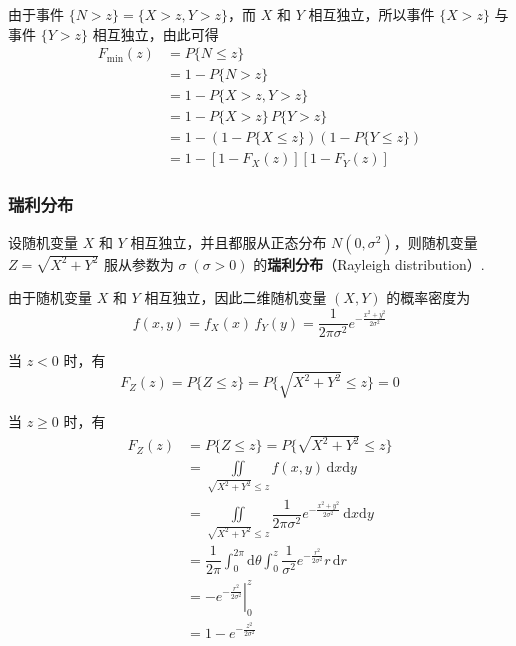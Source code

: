 由于事件 $\{N>z\} = \{X>z, Y>z\}$，而 $X$ 和 $Y$ 相互独立，所以事件 $\{X>z\}$ 与事件 $\{Y>z\}$ 相互独立，由此可得
$$
\begin{aligned}
    F_{\text{min}}(z) &= P\{N \leqslant z\} \\
    &= 1 - P\{N>z\} \\
    &= 1 - P\{X>z, Y>z\} \\
    &= 1 - P\{X>z\} \, P\{Y>z\} \\
    &= 1 - (1 - P\{X \leqslant z\})(1 - P\{Y \leqslant z\}) \\
    &= 1 - [1 - F_{X}(z)][1 - F_{Y}(z)]
\end{aligned}
$$

\subsubsection{瑞利分布}

设随机变量 $X$ 和 $Y$ 相互独立，并且都服从正态分布 $N(0, \sigma^2)$，则随机变量 $Z = \sqrt{X^2 + Y^2}$ 服从参数为 $\sigma \; (\sigma > 0)$ 的\textbf{瑞利分布}（Rayleigh distribution）.

由于随机变量 $X$ 和 $Y$ 相互独立，因此二维随机变量 $(X,Y)$ 的概率密度为
$$
f(x,y) = f_{X}(x) \, f_{Y}(y) = \dfrac{1}{2 \pi \sigma^2} e^{-\frac{x^2 + y^2}{2 \sigma^2}}
$$

当 $z<0$ 时，有
$$
F_{Z}(z) = P\{Z \leqslant z\} = P\{\sqrt{X^2 + Y^2} \leqslant z\} = 0
$$

当 $z \geqslant 0$ 时，有
$$
\begin{aligned}
    F_{Z}(z) &= P\{Z \leqslant z\} = P\{\sqrt{X^2 + Y^2} \leqslant z\} \\
    &= \underset{\sqrt{X^2 + Y^2} \leqslant z}{\iint} f(x,y) \, \text{d}x \text{d}y \\
    &= \underset{\sqrt{X^2 + Y^2} \leqslant z}{\iint} \dfrac{1}{2 \pi \sigma^2} e^{-\frac{x^2 + y^2}{2 \sigma^2}} \, \text{d}x \text{d}y \\
    &= \dfrac{1}{2 \pi} \int_0^{2 \pi} \text{d}\theta \int_0^z \dfrac{1}{\sigma^2} e^{-\frac{r^2}{2 \sigma^2}} r \, \text{d}r \\
    &= \left. -e^{-\frac{r^2}{2 \sigma^2}} \right|_0^z \\
    &= 1 - e^{-\frac{z^2}{2 \sigma^2}}
\end{aligned}
$$